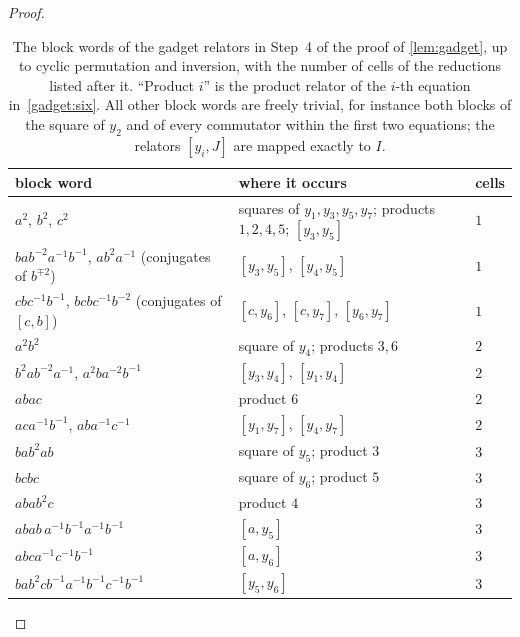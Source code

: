 \begin{proof}
\begin{table}[ht]
\centering\small
\begin{tabular}{@{}lll@{}}
\toprule
block word & where it occurs & cells \\
\midrule
$a^2$, $b^2$, $c^2$ & squares of $y_1,y_3,y_5,y_7$; products $1,2,4,5$; $[y_3,y_5]$ & $1$\\
$bab^{-2}a^{-1}b^{-1}$, $ab^2a^{-1}$ (conjugates of $b^{\mp2}$) & $[y_3,y_5]$, $[y_4,y_5]$ & $1$\\
$cbc^{-1}b^{-1}$, $bcbc^{-1}b^{-2}$ (conjugates of $[c,b]$) & $[c,y_6]$, $[c,y_7]$, $[y_6,y_7]$ & $1$\\
$a^2b^2$ & square of $y_4$; products $3,6$ & $2$\\
$b^2ab^{-2}a^{-1}$, $a^2ba^{-2}b^{-1}$ & $[y_3,y_4]$, $[y_1,y_4]$ & $2$\\
$abac$ & product $6$ & $2$\\
$aca^{-1}b^{-1}$, $aba^{-1}c^{-1}$ & $[y_1,y_7]$, $[y_4,y_7]$ & $2$\\
$bab^2ab$ & square of $y_5$; product $3$ & $3$\\
$bcbc$ & square of $y_6$; product $5$ & $3$\\
$abab^2c$ & product $4$ & $3$\\
$abab\,a^{-1}b^{-1}a^{-1}b^{-1}$ & $[a,y_5]$ & $3$\\
$abca^{-1}c^{-1}b^{-1}$ & $[a,y_6]$ & $3$\\
$bab^2cb^{-1}a^{-1}b^{-1}c^{-1}b^{-1}$ & $[y_5,y_6]$ & $3$\\
\bottomrule
\end{tabular}
\caption{The block words of the gadget relators in Step~4 of the proof of \cref{lem:gadget}, up to cyclic permutation and inversion, with
the number of cells of the reductions listed after it. ``Product $i$'' is the product relator of the $i$-th equation in~\eqref{gadget:six}.
All other block words are freely trivial, for instance both blocks of the square of $y_2$ and of every commutator within the first two
equations; the relators $[y_i,J]$ are mapped exactly to $I$.}
\label{gadget:tab}
\end{table}


\end{proof}
